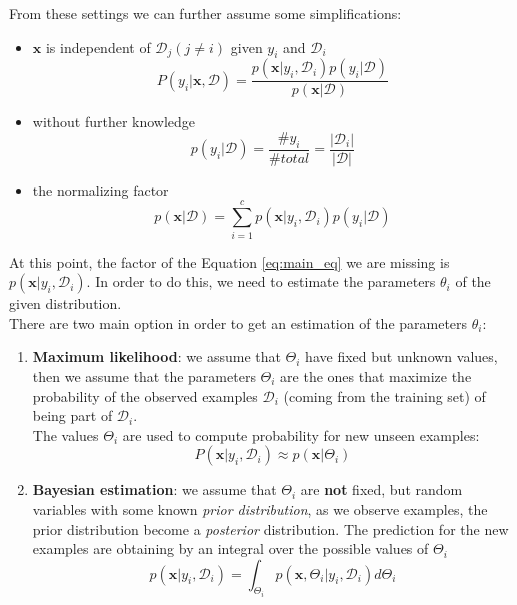 From these settings we can further assume some simplifications: 
\begin{itemize}
    \item $\pmb{x}$ is independent of $\mathcal{D}_j (j \neq i)$ given $y_i$ and $\mathcal{D}_i$
    $$P(y_i|\pmb{x}, \mathcal{D}) = \frac{p(\pmb{x}|y_i, \mathcal{D}_i)p(y_i|\mathcal{D})}{p(\pmb{x}|\mathcal{D})}$$
    \item without further knowledge
    $$p(y_i | \mathcal{D}) = \frac{\#y_i}{\#total} = \frac{|\mathcal{D}_i|}{|\mathcal{D}|}$$
    \item the normalizing factor $$p(\pmb{x} | \mathcal{D}) = \sum_{i=1}^c p(\pmb{x}|y_i, \mathcal{D}_i)p(y_i|\mathcal{D})$$
\end{itemize}

At this point, the factor of the Equation \ref{eq:main_eq} we are missing is $p(\pmb{x}|y_i, \mathcal{D}_i)$. In order to do this, we need to estimate the parameters $\theta_i$ of the given distribution.\\
There are two main option in order to get an estimation of the parameters $\theta_i$:
\begin{enumerate}
    \item \textbf{Maximum likelihood}: we assume that $\Theta_i$ have fixed but unknown values, then we assume that the parameters $\Theta_i$ are the ones that maximize the probability of the observed examples $\mathcal{D}_i$ (coming from the training set) of being part of $\mathcal{D}_i$.\\
    The values $\Theta_i$ are used to compute probability for new unseen examples:
    $$P(\pmb{x}|y_i, \mathcal{D}_i) \approx p(\pmb{x}|\Theta_i)$$
    \item \textbf{Bayesian estimation}: we assume that $\Theta_i$ are \textbf{not} fixed, but random variables with some known \textit{prior distribution}, as we observe examples, the prior distribution become a \textit{posterior} distribution. The prediction for the new examples are obtaining by an integral over the possible values of $\Theta_i$
    $$p(\pmb{x}|y_i, \mathcal{D}_i) = \int_{\Theta_i} p(\pmb{x}, \Theta_i|y_i, \mathcal{D}_i) d\Theta_i$$
\end{enumerate}

